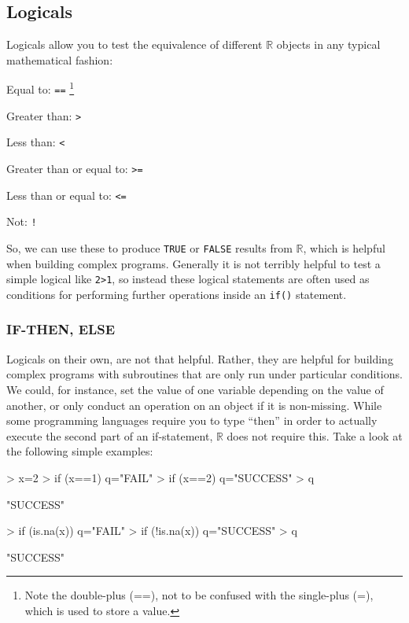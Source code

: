 \documentclass[12pt]{article}
\begin{document}
\subsection{Logicals}
Logicals allow you to test the equivalence of different $\mathbb{R}$ objects in any typical mathematical fashion:
\begin{itemize*}
\item Equal to: \verb|==| \footnote{Note the double-plus (==), not to be confused with the single-plus (=), which is used to store a value.}
\item Greater than: \verb|>|
\item Less than: \verb|<|
\item Greater than or equal to: \verb|>=|
\item Less than or equal to: \verb|<=|
\item Not: \verb|!|
\end{itemize*}
So, we can use these to produce \verb|TRUE| or \verb|FALSE| results from $\mathbb{R}$, which is helpful when building complex programs. Generally it is not terribly helpful to test a simple logical like \verb|2>1|, so instead these logical statements are often used as conditions for performing further operations inside an \verb|if()| statement.

\subsubsection{IF-THEN, ELSE}
Logicals on their own, are not that helpful. Rather, they are helpful for building complex programs with subroutines that are only run under particular conditions. We could, for instance, set the value of one variable depending on the value of another, or only conduct an operation on an object if it is non-missing. While some programming languages require you to type ``then'' in order to actually execute the second part of an if-statement, $\mathbb{R}$ does not require this. Take a look at the following simple examples:
\begin{Schunk}
\begin{Sinput}
> x=2
> if (x==1) q="FAIL"
> if (x==2) q="SUCCESS"
> q
\end{Sinput}
\begin{Soutput}
[1] "SUCCESS"
\end{Soutput}
\begin{Sinput}
> if (is.na(x)) q="FAIL"
> if (!is.na(x)) q="SUCCESS"
> q
\end{Sinput}
\begin{Soutput}
[1] "SUCCESS"
\end{Soutput}
\end{Schunk}
\end{document}
